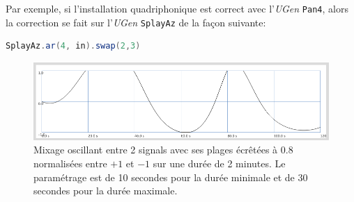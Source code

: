 Par exemple, si l'installation quadriphonique est correct avec l'\textsl{UGen} \texttt{Pan4}, alors la correction se fait sur l'\textsl{UGen} \texttt{SplayAz} de la fa\c con suivante:
 \begin{lstlisting}[basicstyle=\footnotesize\ttfamily,language=Java]
 SplayAz.ar(4, in).swap(2,3)
\end{lstlisting}

\begin{figure}[htbp]
\begin{center}
\includegraphics[width=1\linewidth]{img/6890} 
\caption{Mixage oscillant entre 2 signals avec ses plages \'ecr\^et\'ees \`a 0.8 normalis\'ees entre $+1$ et $-1$ sur une dur\'ee de 2 minutes. Le param\'etrage est de 10 secondes pour la dur\'ee minimale et de 30 secondes pour la dur\'ee maximale.}
\label{fig:mixcurve}
\end{center}
\end{figure}